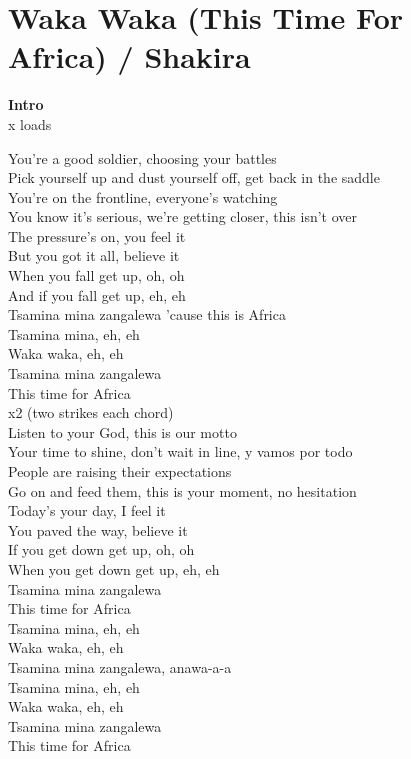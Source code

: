 \section{Waka Waka (This Time For Africa) / Shakira}\label{sec:wakawaka}

  \Cmajor
  \Gmajor
  \Aminor
  \Fmajor
  
  
\textbf{Intro} \\
 x loads

You're a good soldier, choosing your battles\\
Pick yourself up and dust yourself off, get back in the saddle\\
You're on the frontline, everyone's watching\\
You know it's serious, we're getting closer, this isn't over\\
The pressure's on, you feel it\\
But you got it all, believe it\\
When you fall get up, oh, oh\\
And if you fall get up, eh, eh\\
Tsamina mina zangalewa 'cause this is Africa\\
Tsamina mina, eh, eh\\
Waka waka, eh, eh\\
Tsamina mina zangalewa\\
This time for Africa\\
 x2 (two strikes each chord)\\
Listen to your God, this is our motto\\
Your time to shine, don't wait in line, y vamos por todo\\
People are raising their expectations\\
Go on and feed them, this is your moment, no hesitation\\
Today's your day, I feel it\\
You paved the way, believe it\\
If you get down get up, oh, oh\\
When you get down get up, eh, eh\\
Tsamina mina zangalewa\\
This time for Africa\\
Tsamina mina, eh, eh\\
Waka waka, eh, eh\\
Tsamina mina zangalewa, anawa-a-a\\
Tsamina mina, eh, eh\\
Waka waka, eh, eh\\
Tsamina mina zangalewa\\
This time for Africa

